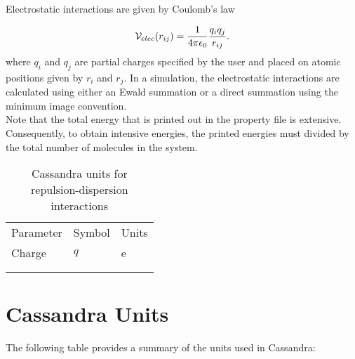 Electrostatic interactions are given by  Coulomb's law

\begin{equation}
{\cal V}_{elec} (r_{ij}) = \frac{1}{4\pi\epsilon_0} \frac {q_i q_j} {r_{ij}}.
\label{Eq:Coulomb}
\end{equation}
where $q_i$ and $q_j$ are partial charges specified by the user and
placed on atomic positions given by $r_i$ and $r_j$. In a simulation,
the electrostatic interactions are calculated using either an Ewald
summation or a direct summation using the minimum image convention. \\

Note that the total energy that is printed out in the property file is extensive. 
Consequently, to obtain intensive energies, the printed energies must divided by 
the total number of molecules in the system. 

\begin{center}
\begin{table}[h]
	\begin{center}
	\caption{Cassandra units for repulsion-dispersion interactions}
	\begin{tabular} {l l l} \\ \hline \hline
	 Parameter & Symbol &  Units \\
	Charge &	 $q$ & e \\ \\ \hline \\
	\end{tabular}
	\end{center}
	\label{Tab:LJ_Units}
\end{table}
\end{center}
\section{Cassandra Units}
The following table provides a summary of the units used in Cassandra:

